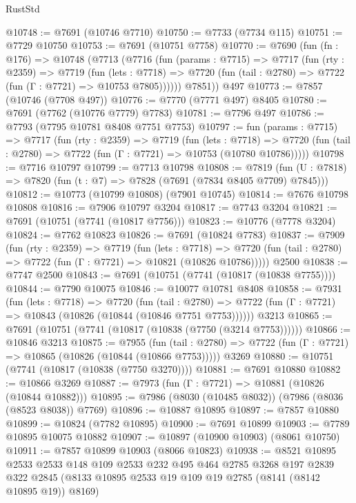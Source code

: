 \begin{lexlean}{RustStd}
\begin{coremodule}
@10748 := @7691 (@10746 @7710)
@10750 := @7733 (@7734 @115)
@10751 := @7729 @10750
@10753 := @7691 (@10751 @7758)
@10770 := @7690
    (fun (fn : @176) =>
    @10748
      (@7713
        (@7716
          (fun (params : @7715) =>
          @7717
            (fun (rty : @2359) =>
            @7719
              (fun (lets : @7718) =>
              @7720 (fun (tail : @2780) => @7722 (fun (Γ : @7721) => @10753 @7805))))))
        @7851))
    @497
@10773 := @7857 (@10746 (@7708 @497))
@10776 := @7770 (@7771 @497) @8405
@10780 := @7691 (@7762 (@10776 @7779) @7783)
@10781 := @7796 @497
@10786 := @7793 (@7795 @10781 @8408 @7751 @7753)
@10797 := fun (params : @7715) =>
  @7717
    (fun (rty : @2359) =>
    @7719
      (fun (lets : @7718) =>
      @7720 (fun (tail : @2780) => @7722 (fun (Γ : @7721) => @10753 (@10780 @10786)))))
@10798 := @7716 @10797
@10799 := @7713 @10798
@10808 := @7819 (fun (U : @7818) => @7820 (fun (t : @7) => @7828 (@7691 (@7834 @8405 @7709) @7845)))
@10812 := @10773 (@10799 @10808) (@7901 @10745)
@10814 := @7676 @10798 @10808
@10816 := @7906 @10797 @3204
@10817 := @7743 @3204
@10821 := @7691 (@10751 (@7741 (@10817 @7756)))
@10823 := @10776 (@7778 @3204)
@10824 := @7762 @10823
@10826 := @7691 (@10824 @7783)
@10837 := @7909
    (fun (rty : @2359) =>
    @7719
      (fun (lets : @7718) =>
      @7720 (fun (tail : @2780) => @7722 (fun (Γ : @7721) => @10821 (@10826 @10786)))))
    @2500
@10838 := @7747 @2500
@10843 := @7691 (@10751 (@7741 (@10817 (@10838 @7755))))
@10844 := @7790 @10075
@10846 := @10077 @10781 @8408
@10858 := @7931
    (fun (lets : @7718) =>
    @7720
      (fun (tail : @2780) =>
      @7722 (fun (Γ : @7721) => @10843 (@10826 (@10844 (@10846 @7751 @7753))))))
    @3213
@10865 := @7691 (@10751 (@7741 (@10817 (@10838 (@7750 (@3214 @7753))))))
@10866 := @10846 @3213
@10875 := @7955
    (fun (tail : @2780) => @7722 (fun (Γ : @7721) => @10865 (@10826 (@10844 (@10866 @7753)))))
    @3269
@10880 := @10751 (@7741 (@10817 (@10838 (@7750 @3270))))
@10881 := @7691 @10880
@10882 := @10866 @3269
@10887 := @7973 (fun (Γ : @7721) => @10881 (@10826 (@10844 @10882)))
@10895 := @7986 (@8030 (@10485 @8032)) (@7986 (@8036 (@8523 @8038)) @7769)
@10896 := @10887 @10895
@10897 := @7857 @10880
@10899 := @10824 (@7782 @10895)
@10900 := @7691 @10899
@10903 := @7789 @10895 @10075 @10882
@10907 := @10897 (@10900 @10903) (@8061 @10750)
@10911 := @7857 @10899 @10903 (@8066 @10823)
@10938 := @8521
    @10895
    @2533
    @2533
    @148
    @109
    @2533
    @232
    @495
    @464
    @2785
    @3268
    @197
    @2839
    @322
    @2845
    (@8133 @10895 @2533 @19 @109 @19 @2785 (@8141 (@8142 @10895 @19)) @8169)

\end{coremodule}
\end{lexlean}
